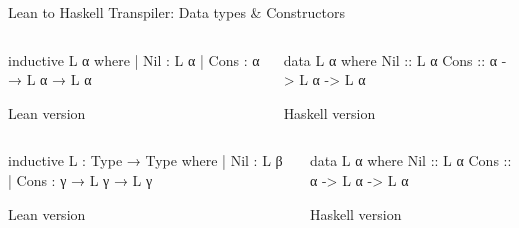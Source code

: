 \begin{frame}[fragile]{Lean to Haskell Transpiler: Data types \& Constructors} %

  \begin{overprint}
    \begin{columns}[T]
      \begin{column}{.48\textwidth}
        \begin{LeanCode}
          inductive L α
            where
            | Nil : L α
            | Cons : α → L α → L α
        \end{LeanCode}
        \centering
        Lean version
      \end{column}
      \begin{column}{.48\textwidth}
        \begin{HaskellCode}[fontsize=\small]
          data L α
            where
            Nil :: L α
            Cons :: α -> L α -> L α
        \end{HaskellCode}
        \centering
        Haskell version
      \end{column}
    \end{columns}
    \begin{columns}[T]
      \begin{column}{.48\textwidth}
        \begin{LeanCode}
          inductive L : Type → Type
            where
            | Nil : L β
            | Cons : γ → L γ → L γ
        \end{LeanCode}
        \centering
        Lean version
      \end{column}
      \begin{column}{.48\textwidth}
        \begin{HaskellCode}[fontsize=\small]
          data L α
            where
            Nil :: L α
            Cons :: α -> L α -> L α
        \end{HaskellCode}
        \centering
        Haskell version
      \end{column}
    \end{columns}
    \begin{columns}[T]
      \begin{column}{.48\textwidth}

\end{column}
\end{columns}
\end{overprint}
\end{frame}
